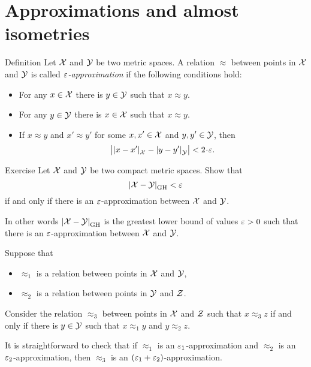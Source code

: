 \section{Approximations and almost isometries}\label{sec:GH-approx}

\begin{thm}{Definition}\label{ex:defGHR}
Let $\mathcal{X}$ and $\mathcal{Y}$ be two metric spaces.
A relation $\approx$ between points in $\mathcal{X}$ and $\mathcal{Y}$ is called \emph{$\varepsilon$-approximation} if the following conditions hold:
\begin{itemize}
\item For any $x\in  \mathcal{X}$ there is $y\in \mathcal{Y}$ such that $x\approx y$.
\item For any $y\in  \mathcal{Y}$ there is $x\in \mathcal{X}$ such that $x\approx y$.
\item If $x\approx y$ and $x'\approx y'$ for some $x, x'\in  \mathcal{X}$ and $y,y'\in \mathcal{Y}$, then 
\[\bigl|\dist{x}{x'}{\spc{X}}-\dist{y}{y'}{\spc{Y}}\bigr|<2\cdot\eps.\]
\end{itemize}

\end{thm}

\begin{thm}{Exercise}\label{ex:H-R}
Let $\mathcal{X}$ and $\mathcal{Y}$ be two compact metric spaces.
Show that
\[\dist{\spc{X}}{\spc{Y}}{\GH}<\eps\]
if and only if there is an $\varepsilon$-approximation between $\mathcal{X}$ and $\mathcal{Y}$.

In other words $\dist{\spc{X}}{\spc{Y}}{\GH}$ is the greatest lower bound of values $\varepsilon>0$ such that  there is an $\varepsilon$-approximation between $\mathcal{X}$ and $\mathcal{Y}$.
\end{thm}

Suppose that 
\begin{itemize}
\item $\approx_1$ is a relation between points in $\mathcal{X}$ and $\mathcal{Y}$,
\item $\approx_2$ is a relation between points in $\mathcal{Y}$ and $\mathcal{Z}$.
\end{itemize}
Consider the relation $\approx_3$ between points in $\mathcal{X}$ and $\mathcal{Z}$ such that
$x\approx_3 z$ if and only if there is $y\in  \mathcal{Y}$ such that 
$x\approx_1 y$ and $y\approx_2 z$.

It is straightforward to check that if $\approx_1$ is an $\varepsilon_1$-approximation and $\approx_2$ is an $\varepsilon_2$-approximation, then $\approx_3$ is an $(\varepsilon_1+\varepsilon_2)$-approximation.

